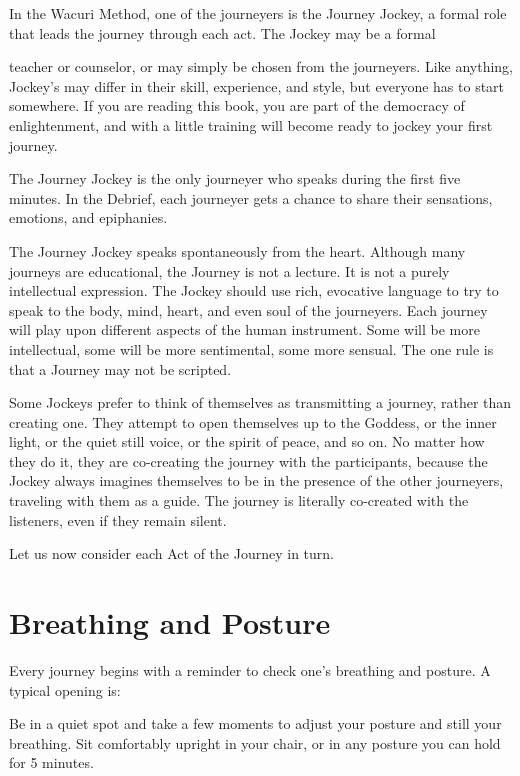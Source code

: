 \documentclass[12pt]{book}
\begin{document}
In the Wacuri Method, one of the journeyers is the Journey Jockey, a formal role that leads the journey through each act. The Jockey may be a formal
					
teacher or counselor, or may simply be chosen from the journeyers. Like anything, Jockey’s may differ in their skill, experience, and style, but everyone has to start somewhere. If you are reading this book, you are part of the democracy of enlightenment, and with a little training will become  ready to jockey your first journey.
					
The Journey Jockey is the only journeyer who speaks during the first five minutes. In the Debrief, each journeyer gets a chance to share their sensations, emotions, and epiphanies.
					
The Journey Jockey speaks spontaneously from the heart. Although many journeys are educational, the Journey is not a lecture. It is not a purely intellectual expression. The Jockey should use rich, evocative language to try to speak to the body, mind, heart, and even soul of the journeyers. Each journey will play upon different aspects of the human instrument. Some will be more intellectual, some will be more sentimental, some more sensual. The one rule is that a Journey may not be scripted.
					
Some Jockeys prefer to think of themselves as transmitting a journey, rather than creating one. They attempt to open themselves up to the Goddess, or the inner light, or the quiet still voice, or the spirit of peace, and so on. No matter how they do it, they are co-creating the journey with the participants, because the Jockey always imagines themselves to be in the presence of the other journeyers, traveling with them as a guide. The journey is literally co-created with the listeners, even if they remain silent.
					
Let us now consider each Act of the Journey in turn.
					
\section{Breathing and Posture}
					
Every journey begins with a reminder to check one’s breathing and posture. A typical opening is:
					
Be in a quiet spot and take a few moments to adjust your posture and still your breathing. Sit comfortably upright in your chair, or in any posture you can hold for 5 minutes.
					
\end{document}
